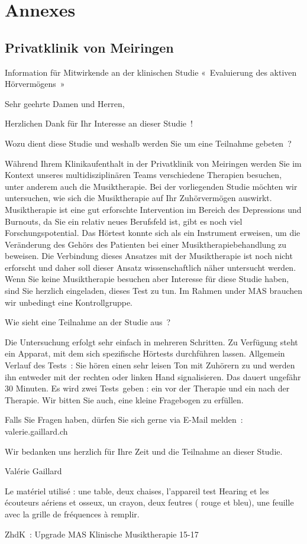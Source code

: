 
\chapter{Annexes}

\section{Privatklinik von Meiringen}

Information für Mitwirkende an der klinischen Studie
« Evaluierung des aktiven Hörvermögens »


Sehr geehrte Damen und Herren,

Herzlichen Dank für Ihr Interesse an dieser Studie !

Wozu dient diese Studie und weshalb werden Sie um eine Teilnahme gebeten ?

Während Ihrem Klinikaufenthalt  in der Privatklinik von Meiringen werden Sie im Kontext 
unseres multidisziplinären Teams verschiedene Therapien besuchen, unter anderem auch die Musiktherapie. Bei der vorliegenden Studie möchten wir untersuchen, wie sich die Musiktherapie auf Ihr Zuhörvermögen auswirkt.
Musiktherapie ist eine gut erforschte Intervention im Bereich des Depressions und Burnouts, da Sie ein relativ neues Berufsfeld ist, gibt es noch viel Forschungspotential.
Das Hörtest konnte sich als ein Instrument erweisen, um die Veränderung des Gehörs des Patienten bei einer Musiktherapiebehandlung zu beweisen. Die Verbindung dieses Ansatzes mit der Musiktherapie ist noch nicht erforscht und daher soll dieser Ansatz wissenschaftlich näher untersucht werden.
Wenn Sie keine Musiktherapie besuchen aber Interesse für diese Studie haben, sind Sie herzlich eingeladen, dieses Test zu tun. Im Rahmen under MAS brauchen wir unbedingt eine Kontrollgruppe.

Wie sieht eine Teilnahme an der Studie aus ?

Die Untersuchung erfolgt sehr einfach in mehreren Schritten.
Zu Verfügung steht ein Apparat, mit dem sich spezifische Hörtests durchführen lassen.
Allgemein Verlauf des Tests :  
Sie hören einen sehr leisen Ton mit Zuhörern zu und werden ihn entweder mit der rechten  oder linken Hand  signalisieren. Das dauert ungefähr 30 Minuten.
Es wird zwei Tests geben : ein vor der Therapie und ein nach der Therapie.
Wir bitten Sie auch, eine kleine Fragebogen zu erfüllen.


Falls Sie Fragen haben, dürfen Sie sich gerne via E-Mail melden : valerie.gaillard\@gmx.ch

Wir bedanken uns herzlich für Ihre Zeit und die Teilnahme an dieser Studie.


Valérie Gaillard

 Le matériel utilisé : une table, deux chaises, l'appareil
test Hearing et les écouteurs aériens et osseux, un crayon, deux
feutres ( rouge et bleu), une feuille avec la grille de fréquences à
remplir.

ZhdK : Upgrade MAS Klinische Musiktherapie 15-17
